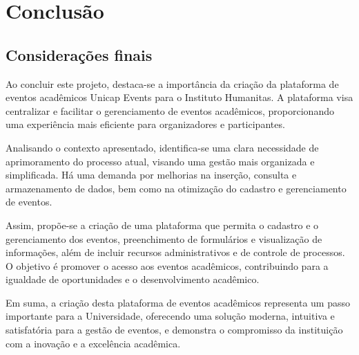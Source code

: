 \chapter{Conclusão}

\section{Considerações finais}

Ao concluir este projeto, destaca-se a importância da criação da plataforma de eventos acadêmicos Unicap Events para o Instituto Humanitas. A plataforma visa centralizar e facilitar o gerenciamento de eventos acadêmicos, proporcionando uma experiência mais eficiente para organizadores e participantes.

Analisando o contexto apresentado, identifica-se uma clara necessidade de aprimoramento do processo atual, visando uma gestão mais organizada e simplificada. Há uma demanda por melhorias na inserção, consulta e armazenamento de dados, bem como na otimização do cadastro e gerenciamento de eventos.

Assim, propõe-se a criação de uma plataforma que permita o cadastro e o gerenciamento dos eventos, preenchimento de formulários e visualização de informações, além de incluir recursos administrativos e de controle de processos. O objetivo é promover o acesso aos eventos acadêmicos, contribuindo para a igualdade de oportunidades e o desenvolvimento acadêmico.

Em suma, a criação desta plataforma de eventos acadêmicos representa um passo importante para a Universidade, oferecendo uma solução moderna, intuitiva e satisfatória para a gestão de eventos, e demonstra o compromisso da instituição com a inovação e a excelência acadêmica.